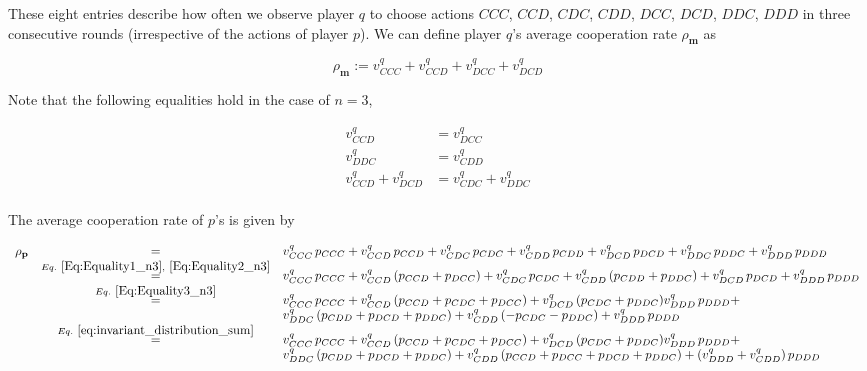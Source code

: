 \documentclass{article}
\theoremstyle{definition}
\begin{document}
These eight entries describe how often we observe player $q$ to choose actions
$CCC$, $CCD$, $CDC$, $CDD$, $DCC$, $DCD$, $DDC$, $DDD$ in three consecutive
rounds (irrespective of the actions of player $p$). We can define player $q$'s
average cooperation rate $\rho_\mathbf{m}$ as 

\begin{equation} \label{Eq:rhoq_n3}
\rho_\mathbf{m} := v^q_{CCC} + v^q_{CCD} + v^q_{DCC} + v^q_{DCD}
\end{equation}

Note that the following equalities hold in the case of $n=3$,

\begin{align}
  v^{q}_{CCD} & = v^{q}_{DCC} \\ \label{Eq:Equality1_n3}
  v^{q}_{DDC} & = v^{q}_{CDD} \\ \label{Eq:Equality2_n3}
  v^{q}_{CCD} + v^{q}_{DCD}  & = v^{q}_{CDC} + v^{q}_{DDC} \\ \label{Eq:Equality3_n3}
\end{align}

The average cooperation rate of $p$'s is given by

\small{
\begin{equation} \label{Eq:rhop_n3}
\begin{array}{lcl}
\rho_\mathbf{p} & = &\displaystyle v^q_{CCC}\, p_{CCC}+ v^q_{CCD}\, p_{CCD} + v^q_{CDC}\, p_{CDC} + v^q_{CDD}\, p_{CDD} + v^q_{DCD}\, p_{DCD} + v^q_{DDC}\, p_{DDC} + v^q_{DDD}\, p_{DDD} \\
&\stackrel{Eq.~\eqref{Eq:Equality1_n3},~\eqref{Eq:Equality2_n3} }{=}& v^q_{CCC}\, p_{CCC} + v^q_{CCD}\, (p_{CCD} + p_{DCC}) + v^q_{CDC}\, p_{CDC} + v^q_{CDD}\, (p_{CDD} + p_{DDC}) + v^q_{DCD}\, p_{DCD} +  v^q_{DDD}\, p_{DDD} \\
&\stackrel{Eq.~\eqref{Eq:Equality3_n3}}{=}& v^q_{CCC}\, p_{CCC} + v^q_{CCD}\, (p_{CCD} + p_{CDC} + p_{DCC}) + v^q_{DCD}\, (p_{CDC} + p_{DDC}) v^q_{DDD}\, p_{DDD} + \\
& & v^q_{DDC}\, (p_{CDD} + p_{DCD} + p_{DDC}) + v^q_{CDD}\, (- p_{CDC} - p_{DDC})  + v^q_{DDD}\, p_{DDD} \\
&\stackrel{Eq.~\eqref{eq:invariant_distribution_sum}}{=}& v^q_{CCC}\, p_{CCC} + v^q_{CCD}\, (p_{CCD} + p_{CDC} + p_{DCC}) + v^q_{DCD}\, (p_{CDC} + p_{DDC}) v^q_{DDD}\, p_{DDD} + \\
& & v^q_{DDC}\, (p_{CDD} + p_{DCD} + p_{DDC}) + v^q_{CDD}\, (p_{CCD} + p_{DCC} + p_{DCD} + p_{DDC})  + (v^q_{DDD} + v^q_{CDD})\, p_{DDD} \\
\end{array}
\end{equation}
}
 
\end{document}
